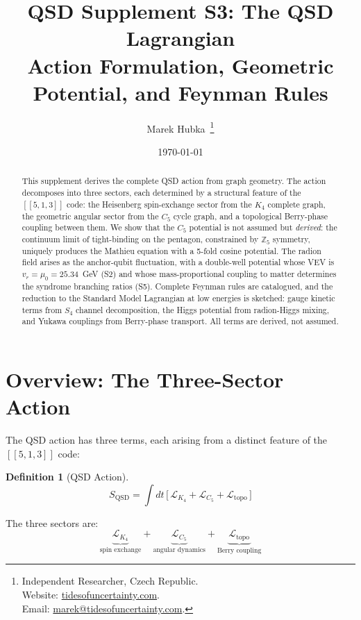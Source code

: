 \documentclass[11pt,a4paper]{article}
\title{
  \textbf{QSD Supplement S3: The QSD Lagrangian}\\[0.5em]
  \Large Action Formulation, Geometric Potential, and Feynman Rules\\[1em]
}
\author{
  Marek Hubka\, \orcidlink{0009-0003-2476-9017}
  \thanks{
    Independent Researcher, Czech Republic.\\
    Website: \href{http://www.tidesofuncertainty.com}{tidesofuncertainty.com}.\\
    Email: \href{mailto:marek@tidesofuncertainty.com}{marek@tidesofuncertainty.com}.
  }
}
\date{\today}
\theoremstyle{definition}
\newtheorem{definition}[theorem]{Definition}
\theoremstyle{remark}
\newcommand{\murad}{\mu_0}
\newcommand{\LL}{\mathcal{L}}
\begin{document}
\maketitle

\begin{abstract}
\noindent This supplement derives the complete QSD action from graph geometry. The action decomposes into three sectors, each determined by a structural feature of the $[[5,1,3]]$ code: the Heisenberg spin-exchange sector from the $K_4$ complete graph, the geometric angular sector from the $C_5$ cycle graph, and a topological Berry-phase coupling between them. We show that the $C_5$ potential is not assumed but \emph{derived}: the continuum limit of tight-binding on the pentagon, constrained by $\mathbb{Z}_5$ symmetry, uniquely produces the Mathieu equation with a 5-fold cosine potential. The radion field arises as the anchor-qubit fluctuation, with a double-well potential whose VEV is $v_r = \murad = 25.34$~GeV (S2) and whose mass-proportional coupling to matter determines the syndrome branching ratios (S5). Complete Feynman rules are catalogued, and the reduction to the Standard Model Lagrangian at low energies is sketched: gauge kinetic terms from $S_4$ channel decomposition, the Higgs potential from radion-Higgs mixing, and Yukawa couplings from Berry-phase transport. All terms are derived, not assumed.
\end{abstract}

\tableofcontents
\newpage

\section{Overview: The Three-Sector Action}
\label{sec:overview}

The QSD action has three terms, each arising from a distinct feature of the $[[5,1,3]]$ code:

\begin{definition}[QSD Action]
\label{def:action}
\begin{equation}
\boxed{S_{\mathrm{QSD}} = \int dt\,\Big[\,\LL_{K_4} + \LL_{C_5} + \LL_{\mathrm{topo}}\,\Big]}
\end{equation}
\end{definition}

The three sectors are:
\begin{equation}
\underbrace{\LL_{K_4}}_{\text{spin exchange}} + \underbrace{\LL_{C_5}}_{\text{angular dynamics}} + \underbrace{\LL_{\mathrm{topo}}}_{\text{Berry coupling}}
\end{equation}
\end{document}
